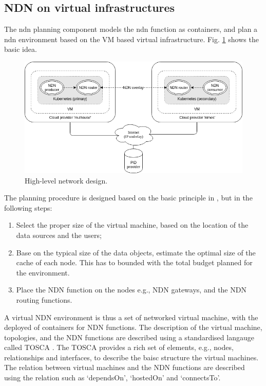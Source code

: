 \documentclass[conference]{IEEEtran}
\begin{document}
\subsection{NDN on virtual infrastructures}
The \gls{ndn} planning component models the \gls{ndn} function as containers, and plan a \gls{ndn} environment based on the VM based virtual infrastructure. Fig. \ref{fig:high-level-network-design} shows the basic idea. 

\begin{figure}[H]
\centering
\includegraphics[width=\columnwidth]{images/high-level-network-design.png}
\caption{High-level network design.}
\label{fig:high-level-network-design}
\end{figure}

The planning procedure is designed based on the basic  principle in \cite{mccabe2010network}, but in the following steps:
\begin{enumerate}
    \item Select the proper size of the virtual machine, based on the location of the data sources and the users;
    \item Base on the typical size of the data objects, estimate the optimal size of the cache of each node. This has to bounded with the total budget planned for the environment. 
    \item Place the NDN function on the nodes e.g., NDN gateways, and the NDN routing functions. 
\end{enumerate}

A virtual NDN environment is thus a set of networked virtual machine, with the deployed of containers for NDN functions. The description of the virtual machine, topologies, and the NDN functions are described using a standardised langauge called TOSCA \cite{tosca-standard}.
The TOSCA provides a rich set of elements, e.g., nodes, relationships and interfaces, to describe the baisc structure the virtual machines. The relation between virtual machines and the NDN functions are described using the relation such as `dependsOn', `hostedOn' and `connectsTo'. 
\end{document}
